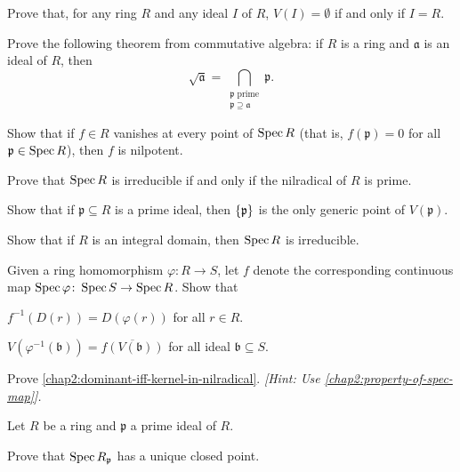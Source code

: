 \begin{problems}
	\item Prove that, for any ring $R$ and any ideal $I$ of $R$, $V(I) = \emptyset$ if and only if $I = R$.
	
	\item Prove the following theorem from commutative algebra: if $R$ is a ring and $\mathfrak{a}$ is an ideal of $R$, then
	\begin{equation*}
		\sqrt{\mathfrak{a}} = \bigcap_{\substack{\mathfrak{p} \text{ prime} \\ \mathfrak{p} \supseteq \mathfrak{a}}} \mathfrak{p}.
	\end{equation*}
	
	\item Show that if $f \in R$ vanishes at every point of $\operatorname{Spec} R$ (that is, $f(\mathfrak{p}) = 0$ for all $\mathfrak{p} \in \operatorname{Spec} R$), then $f$ is nilpotent.
	
	
	\item Prove that $\operatorname{Spec} R$ is irreducible if and only if the nilradical of $R$ is prime.
	
	\item Show that if $\mathfrak{p} \subseteq R$ is a prime ideal, then $\lbrace\mathfrak{p}\rbrace$ is the only generic point of $V(\mathfrak{p})$.
	
	\item Show that if $R$ is an integral domain, then $\operatorname{Spec} R$ is irreducible.
	
	\item \label{chap2:property-of-spec-map} Given a ring homomorphism $\varphi \colon R \to S$, let $f$ denote the corresponding continuous map $\operatorname{Spec} \varphi \colon \operatorname{Spec} S \to \operatorname{Spec} R$. Show that 
	\begin{problems}
		\item $f^{-1}(D(r)) = D(\varphi(r))$ for all $r \in R$.
		
		\item $V(\varphi^{-1}(\mathfrak{b})) = \overline{f(V(\mathfrak{b}))}$ for all ideal $\mathfrak{b} \subseteq S$.
	\end{problems}
	
	\item \label{chap2:dominant-iff-kernel-in-nilradical-problem} Prove \cref{chap2:dominant-iff-kernel-in-nilradical}. \textit{[Hint: Use \cref{chap2:property-of-spec-map}].}
	
	\item Let $R$ be a ring and $\mathfrak{p}$ a prime ideal of $R$. 
	\begin{problems}
		\item Prove that $\operatorname{Spec} R_{\mathfrak{p}}$ has a unique closed point.
		

\end{problems}
\end{problems}
